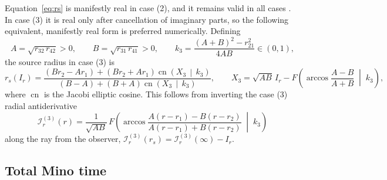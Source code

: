 \documentclass[11pt]{article}
\begin{document}
Equation~\eqref{eq:rs} is manifestly real in case (2), and it remains valid in
all cases \cite{GL2020null}. In case (3) it is real only after cancellation of
imaginary parts, so the following equivalent, manifestly real form is preferred
numerically. Defining
\begin{equation}
A = \sqrt{r_{32}\,r_{42}} > 0, \qquad
B = \sqrt{r_{31}\,r_{41}} > 0, \qquad
k_3 = \frac{(A+B)^2 - r_{21}^2}{4AB} \in (0,1),
\end{equation}
the source radius in case (3) is
\begin{equation}
r_s(I_r) = \frac{\left(B r_2 - A r_1\right) + \left(B r_2 + A r_1\right)\operatorname{cn}\!\left(X_3 \,\middle|\, k_3\right)}
                 {\left(B - A\right) + \left(B + A\right)\operatorname{cn}\!\left(X_3 \,\middle|\, k_3\right)},
\qquad
X_3 = \sqrt{AB}\,I_r - F\!\left(\arccos\frac{A - B}{A + B}\;\middle|\;k_3\right),
\label{eq:rs3}
\end{equation}
where $\operatorname{cn}$ is the Jacobi elliptic cosine. This follows from
inverting the case (3) radial antiderivative \cite{GL2020lensing,GL2020null}
\begin{equation}
\mathcal{I}_r^{(3)}(r) = \frac{1}{\sqrt{AB}}\,
F\!\left(\arccos\frac{A(r - r_1) - B(r - r_2)}{A(r - r_1) + B(r - r_2)}\;\middle|\;k_3\right)
\end{equation}
along the ray from the observer, $\mathcal{I}_r^{(3)}(r_s) = \mathcal{I}_r^{(3)}(\infty) - I_r$.

\subsection{Total Mino time}
\end{document}

